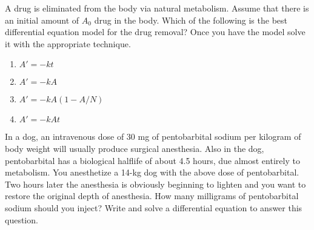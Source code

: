 \begin{problem}
    A drug is eliminated from the body via natural metabolism.  Assume that there is an
    initial amount of $A_0$ drug in the body.  Which of the following is the best
    differential equation model for the drug removal?  Once you have the model solve it
    with the appropriate technique.
    \begin{enumerate}
        \item $A' = -kt$
        \item $A' = -kA$
        \item $A' = -kA(1-A/N)$
        \item $A' = -kAt$
    \end{enumerate}
\end{problem}

\begin{problem}
    In a dog, an intravenous dose of 30 mg of pentobarbital sodium per kilogram of body
    weight will usually produce surgical anesthesia. Also in the dog, pentobarbital has a
    biological halflife of about 4.5 hours, due almost entirely to metabolism.  You
    anesthetize a 14-kg dog with the above dose of pentobarbital. Two hours later the
    anesthesia is obviously beginning to lighten and you want to restore the original
    depth of anesthesia. How many milligrams of pentobarbital sodium should you inject?
    Write and solve a differential equation to answer this question.
\end{problem}


